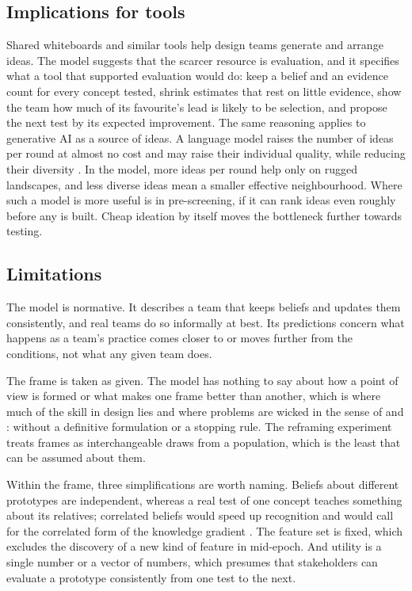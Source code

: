 \documentclass[10pt,twocolumn]{article}
\theoremstyle{definition}
\begin{document}
\subsection{Implications for tools}

Shared whiteboards and similar tools help design teams generate and arrange ideas. The model suggests that the scarcer resource is evaluation, and it specifies what a tool that supported evaluation would do: keep a belief and an evidence count for every concept tested, shrink estimates that rest on little evidence, show the team how much of its favourite's lead is likely to be selection, and propose the next test by its expected improvement. The same reasoning applies to generative AI as a source of ideas. A language model raises the number of ideas per round at almost no cost and may raise their individual quality, while reducing their diversity \citep{doshi2024}. In the model, more ideas per round help only on rugged landscapes, and less diverse ideas mean a smaller effective neighbourhood. Where such a model is more useful is in pre-screening, if it can rank ideas even roughly before any is built. Cheap ideation by itself moves the bottleneck further towards testing.

\subsection{Limitations}

The model is normative. It describes a team that keeps beliefs and updates them consistently, and real teams do so informally at best. Its predictions concern what happens as a team's practice comes closer to or moves further from the conditions, not what any given team does.

The frame is taken as given. The model has nothing to say about how a point of view is formed or what makes one frame better than another, which is where much of the skill in design lies and where problems are wicked in the sense of \citet{rittel1973} and \citet{buchanan1992}: without a definitive formulation or a stopping rule. The reframing experiment treats frames as interchangeable draws from a population, which is the least that can be assumed about them.

Within the frame, three simplifications are worth naming. Beliefs about different prototypes are independent, whereas a real test of one concept teaches something about its relatives; correlated beliefs would speed up recognition and would call for the correlated form of the knowledge gradient \citep{frazier2009}. The feature set is fixed, which excludes the discovery of a new kind of feature in mid-epoch. And utility is a single number or a vector of numbers, which presumes that stakeholders can evaluate a prototype consistently from one test to the next.
\end{document}
